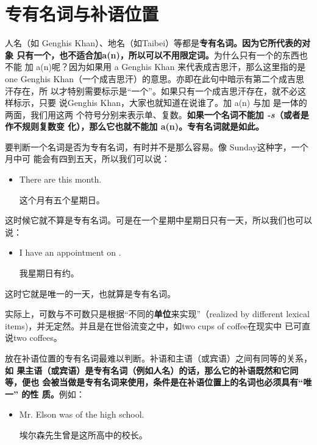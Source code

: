 \section{专有名词与补语位置}

人名（如 Genghis Khan）、地名（如Taibei）等都是\textbf{专有名词。因为它所代表的对象
  只有一个，也不适合加a(n)，所以可以不用限定词。}为什么只有一个的东西也不能
加 a(n)呢？因为如果用 a Genghis Khan 来代表成吉思汗，那么这里指的是 one
Genghis Khan（一个成吉思汗）的意思。亦即在此句中暗示有第二个成吉思汗存在，所
以才特别需要标示是“一个”。如果只有一个成吉思汗存在，就不必这样标示，只要
说Genghis Khan，大家也就知道在说谁了。加 a(n) 与加 是一体的两面，我们用这两
个符号分别来表示单、复数。\textbf{如果一个名词不能加 \emph{-s}（或者是作不规则复数变
  化），那么它也就不能加 a(n)。专有名词就是如此。}

要判断一个名词是否为专有名词，有时并不是那么容易。像 Sunday这种字，一个月中可
能会有四到五天，所以我们可以说：
\begin{itemize}
\item There are  this month.

  这个月有五个星期日。
\end{itemize}

这时候它就不算是专有名词。可是在一个星期中星期日只有一天，所以我们也可以说：
\begin{itemize}
\item I have an appointment on .

  我星期日有约。
\end{itemize}

这时它就是唯一的一天，也就算是专有名词。

实际上，可数与不可数只是根据“不同的\textbf{单位}来实现”（realized by different
lexical items)，并无定然。并且是在世俗流变之中，如two cups of coffee在现实中
已可直说two coffees。




放在补语位置的专有名词最难以判断。补语和主语（或宾语）之间有同等的关系，\textbf{如
  果主语（或宾语）是专有名词（例如人名）的话，那么它的补语既然和它同等，便也
  会被当做是专有名词来使用，条件是在补语位置上的名词也必须具有“唯一” 的性
  质。}例如：

\begin{itemize}
\item Mr. Elson was  of the high school.

  埃尔森先生曾是这所高中的校长。
\end{itemize}

